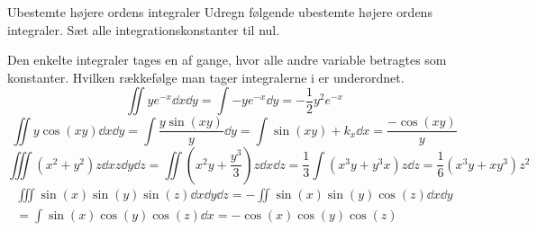\begin{opgave}{Ubestemte højere ordens integraler}
    Udregn følgende ubestemte højere ordens integraler.  Sæt alle integrationskonstanter til nul.
    
    Den enkelte integraler tages en af gange, hvor alle andre variable betragtes som konstanter.
    Hvilken rækkefølge man tager integralerne i er underordnet.
    \opg $$\iint ye^{-x}\dd{x}\dd{y}=\int -ye^{-x}\dd{y}=-\frac{1}{2}y^2e^{-x}$$
    \opg $$\iint y\cos(xy)\dd{x}\dd{y} =\int \frac{y\sin(xy)}{y}\dd{y}=\int \sin(xy)+k_x\dd{x}=\frac{-\cos(xy)}{y}$$
    \opg $$\iiint (x^2+y^2)z\dd{x}z\dd{y}\dd{z}=\iint (x^2y+\frac{y^3}{3})z\dd{x}\dd{z}=\frac{1}{3}\int (x^3y+y^3x)z\dd{z} =\frac{1}{6}(x^3y+xy^3)z^2$$
    \opg \begin{gather*}\iiint \sin(x)\sin(y)\sin(z)\dd{x}\dd{y}\dd{z}=-\iint\sin(x)\sin(y)\cos(z)\dd{x}\dd{y}\\=\int\sin(x)\cos(y)\cos(z)\dd{x}=-\cos(x)\cos(y)\cos(z)\end{gather*}
\end{opgave}
